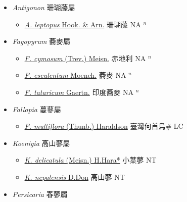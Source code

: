 
  \begin{itemize}
 \item[] \textit{Antigonon} 珊瑚藤屬
                    
  \begin{itemize}
        \item[] \href{http://www.theplantlist.org/tpl1.1/search?q=Antigonon+leptopus}{\textit{A. leptopus} Hook. \& Arn.}   珊瑚藤 NA $^n$
  \end{itemize}
 \item[] \textit{Fagopyrum} 蕎麥屬
                    
  \begin{itemize}
        \item[] \href{http://www.theplantlist.org/tpl1.1/search?q=Fagopyrum+cymosum}{\textit{F. cymosum} (Trev.) Meisn.}   赤地利 NA $^n$
        \item[] \href{http://www.theplantlist.org/tpl1.1/search?q=Fagopyrum+esculentum}{\textit{F. esculentum} Moench.}   蕎麥 NA $^n$
        \item[] \href{http://www.theplantlist.org/tpl1.1/search?q=Fagopyrum+tataricum}{\textit{F. tataricum} Gaertn.}   印度蕎麥 NA $^n$
  \end{itemize}
 \item[] \textit{Fallopia} 蔓蓼屬
                    
  \begin{itemize}
        \item[] \href{http://www.theplantlist.org/tpl1.1/search?q=Fallopia+multiflora}{\textit{F. multiflora} (Thunb.) Haraldson}     臺灣何首烏\# LC
  \end{itemize}
 \item[] \textit{Koenigia} 高山蓼屬
                    
  \begin{itemize}
        \item[] \href{http://www.theplantlist.org/tpl1.1/search?q=Koenigia+delicatula}{\textit{K. delicatula} (Meisn.) H.Hara*}   小葉蓼 NT
        \item[] \href{http://www.theplantlist.org/tpl1.1/search?q=Koenigia+nepalensis}{\textit{K. nepalensis} D.Don}     高山蓼 NT
  \end{itemize}
 \item[] \textit{Persicaria} 春蓼屬
                    

\end{itemize}
